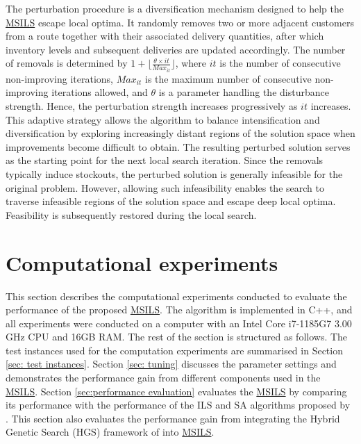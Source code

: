 \documentclass{article}
\begin{document}
The perturbation procedure is a diversification mechanism designed to help the \hyperref[alg:MSILS]{MSILS} escape local optima. It randomly removes two or more adjacent customers from a route together with their associated delivery quantities, after which inventory levels and subsequent deliveries are updated accordingly. The number of removals is determined by $1+\lfloor\frac{\theta \times it}{Max_{it}}\rfloor$, where $it$ is the number of consecutive non-improving iterations, $Max_{it}$ is the maximum number of consecutive non-improving iterations allowed, and $\theta$ is a parameter handling the disturbance strength. Hence, the perturbation strength increases progressively as $it$ increases. This adaptive strategy allows the algorithm to balance intensification and diversification by exploring increasingly distant regions of the solution space when improvements become difficult to obtain. The resulting perturbed solution serves as the starting point for the next local search iteration. Since the removals typically induce stockouts, the perturbed solution is generally infeasible for the original problem. However, allowing such infeasibility enables the search to traverse infeasible regions of the solution space and escape deep local optima. Feasibility is subsequently restored during the local search.


\section{Computational experiments} \label{sec: computational experiements}

This section describes the computational experiments conducted to evaluate the performance of the proposed \hyperref[alg:MSILS]{MSILS}. The algorithm is implemented in C++, and all experiments were conducted on a computer with an Intel Core i7-1185G7 3.00 GHz CPU and 16GB RAM. The rest of the section is structured as follows. The test instances used for the computation experiments are summarised in Section \ref{sec: test instances}. Section \ref{sec: tuning} discusses the parameter settings and demonstrates the performance gain from different components used in the \hyperref[alg:MSILS]{MSILS}. Section \ref{sec:performance evaluation} evaluates the \hyperref[alg:MSILS]{MSILS} by comparing its performance with the performance of the ILS and SA algorithms proposed by \cite{alvarez2018iterated}. This section also evaluates the performance gain from integrating the Hybrid Genetic Search (HGS) framework of \cite{vidal2022hybrid} into \hyperref[alg:MSILS]{MSILS}.
\end{document}
